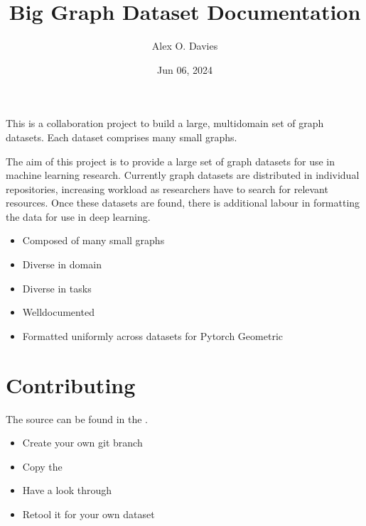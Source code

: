 \documentclass[letterpaper,10pt,english]{sphinxhowto}
\title{Big Graph Dataset Documentation}
\date{Jun 06, 2024}
\author{Alex O. Davies}
\begin{document}
\pagestyle{empty}
\sphinxmaketitle
\pagestyle{plain}
\sphinxtableofcontents
\pagestyle{normal}
\label{\detokenize{index::doc}}


\sphinxAtStartPar
This is a collaboration project to build a large, multi\sphinxhyphen{}domain set of graph datasets.
Each dataset comprises many small graphs.

\sphinxAtStartPar
The aim of this project is to provide a large set of graph datasets for use in machine learning research.
Currently graph datasets are distributed in individual repositories, increasing workload as researchers have to search for relevant resources.
Once these datasets are found, there is additional labour in formatting the data for use in deep learning.
\begin{description}
\begin{itemize}
\item {} 
\sphinxAtStartPar
Composed of many small graphs

\item {} 
\sphinxAtStartPar
Diverse in domain

\item {} 
\sphinxAtStartPar
Diverse in tasks

\item {} 
\sphinxAtStartPar
Well\sphinxhyphen{}documented

\item {} 
\sphinxAtStartPar
Formatted uniformly across datasets for Pytorch Geometric

\end{itemize}

\end{description}


\section{Contributing}
\label{\detokenize{index:contributing}}
\sphinxAtStartPar
The source can be found in the .
\begin{description}
\begin{itemize}
\item {} 
\sphinxAtStartPar
Create your own git branch

\item {} 
\sphinxAtStartPar
Copy the 

\item {} 
\sphinxAtStartPar
Have a look through

\item {} 
\sphinxAtStartPar
Re\sphinxhyphen{}tool it for your own dataset

\end{itemize}

\end{description}
\end{document}
